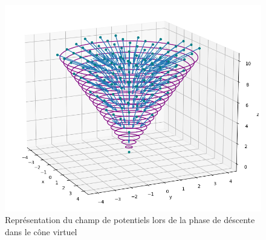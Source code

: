 \begin{figure}[H]
    \centering\includegraphics[width=150mm]{images/phases_approche/potent_phase_2.png}
    \caption{Représentation du champ de potentiels lors de la phase de déscente dans le cône virtuel \cite{quiver}}
\end{figure}
